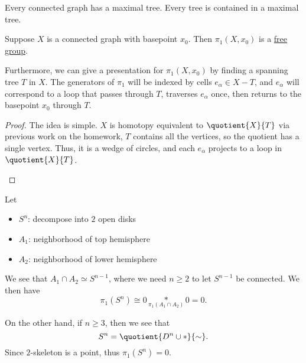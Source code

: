 \begin{theorem}
	Every connected graph has a maximal tree. Every tree is contained in a maximal tree.
\end{theorem}

\begin{corollary}
	Suppose \(X\) is a connected graph with basepoint \(x_0\). Then \(\pi _1(X, x_0)\) is a \hyperref[def:free-group]{free group}.

	\par Furthermore, we can give a presentation for \(\pi _1(X, x_0)\) by finding a spanning tree \(T\) in \(X\). The generators of
	\(\pi _1\) will be indexed by cells \(e_\alpha \in X-T\), and \(e_\alpha \) will correspond to a loop that passes through \(T\),
	traverses \(e_\alpha \) once, then returns to the basepoint \(x_0\) through \(T\).
\end{corollary}
\begin{proof}
	The idea is simple. \(X\) is homotopy equivalent to \(\quotient{X}{T}\) via previous work on the homework, \(T\) contains all the vertices,
	so the quotient has a single vertex. Thus, it is a wedge of circles, and each \(e_\alpha \) projects to a loop in \(\quotient{X}{T} \).
	\begin{figure}[H]
		\centering
		\label{fig:lec12-pf}
	\end{figure}
\end{proof}

\begin{eg}
	Let
	\begin{itemize}
		\item \(S^n\): decompose into \(2\) open disks
		\item \(A_1\): neighborhood of top hemisphere
		\item \(A_2\): neighborhood of lower hemisphere
	\end{itemize}
	We see that \(A_1 \cap A_2\simeq S^{n-1}\), where we need \(n\geq 2\) to let \(S^{n-1}\) be connected. We then have
	\[
		\pi _1(S^n)\cong 0\underset{\pi _1(A_1 \cap A_2)}{\ast}0 = 0.
	\]

	On the other hand, if \(n\geq 3\), then we see that
	\[
		S^n = \quotient{D^{n} \cup \ast}{\sim} .
	\]
	Since \(2\)-skeleton is a point, thus \(\pi _1(S^n) = 0\).
\end{eg}